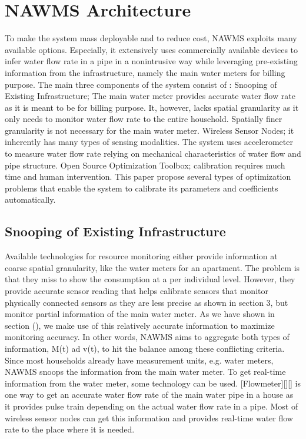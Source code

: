 \section{ NAWMS Architecture}

To make the system mass deployable and to reduce cost, NAWMS exploits many available options. Especially, it extensively uses commercially available devices to infer water flow rate in a pipe in a nonintrusive way while leveraging pre-existing information from the infrastructure, namely the main water meters for billing purpose. 
The main three components of the system consist of : 
 Snooping of Existing Infrastructure; The main water meter provides accurate water flow rate as it is meant to be for billing purpose. It, however, lacks spatial granularity as it only needs to monitor water flow rate to the entire household. Spatially finer granularity is not necessary for the main water meter. 
 Wireless Sensor Nodes; it inherently has many types of sensing modalities. The system uses accelerometer to measure water flow rate relying on mechanical characteristics of water flow and pipe structure.
 Open Source Optimization Toolbox; calibration requires much time and human intervention. This paper propose several types of optimization problems that enable the system to calibrate its parameters and coefficients automatically. 

\subsection{ Snooping of Existing Infrastructure }
Available technologies for resource monitoring either provide information at coarse spatial granularity, like the water meters for an apartment. The problem is that they miss to show the consumption at a per individual level. 
However, they provide accurate sensor reading that helps calibrate sensors that monitor physically connected sensors as they are less precise as shown in section 3, but monitor partial information of the main water meter. As we have shown in section (), we make use of this relatively accurate information to maximize monitoring accuracy. In other words, NAWMS aims to aggregate both types of information, M(t) ad v(t), to hit the balance among these conflicting criteria. Since most households already have measurement units, e.g. water meters, NAWMS snoops the information from the main water meter.  
To get real-time information from the water meter, some technology can be used. [Flowmeter][][] is one way to get an accurate water flow rate of the main water pipe in a house as it provides pulse train depending on the actual water flow rate in a pipe. Most of wireless sensor nodes can get this information and provides real-time water flow rate to the place where it is needed. 

